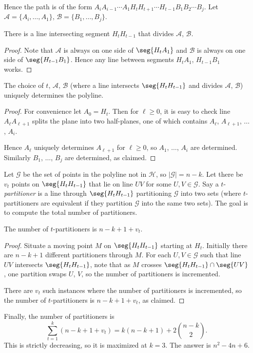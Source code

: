 Hence the path is of the form $A_iA_{i-1}\cdots A_1H_tH_{t+1}\cdots H_{t-1}B_1B_2\cdots B_j$. Let $\mathcal A=\{A_i,\ldots,A_1\}$, $\mathcal B=\{B_1,\ldots,B_j\}$.
\begin{claim}
    There is a line intersecting segment $H_tH_{t-1}$ that divides $\mathcal A$, $\mathcal B$.
\end{claim}
\begin{proof}
    Note that $\mathcal A$ is always on one side of $\seg{H_tA_1}$ and $\mathcal B$ is always on one side of $\seg{H_{t-1}B_1}$. Hence any line between segments $H_tA_1$, $H_{t-1}B_1$ works.
\end{proof}
\begin{claim}
    The choice of $t$, $\mathcal A$, $\mathcal B$ (where a line intersects $\seg{H_tH_{t-1}}$ and divides $\mathcal A$, $\mathcal B$) uniquely determines the polyline.
\end{claim}
\begin{proof}
    For convenience let $A_0=H_t$. Then for $\ell\ge0$, it is easy to check line $A_\ell A_{\ell+1}$ splits the plane into two half-planes, one of which contains $A_\ell$, $A_{\ell+1}$, $\ldots$, $A_i$.

    Hence $A_\ell$ uniquely determines $A_{\ell+1}$ for $\ell\ge0$, so $A_1$, $\ldots$, $A_i$ are determined. Similarly $B_1$, $\ldots$, $B_j$ are determined, as claimed.
\end{proof}

Let $\mathcal G$ be the set of points in the polyline not in $\mathcal H$, so $|\mathcal G|=n-k$. Let there be $v_t$ points on $\seg{H_tH_{t-1}}$ that lie on line $UV$ for some $U,V\in\mathcal G$. Say a $t$-\emph{partitioner} is a line through $\seg{H_tH_{t-1}}$ partitioning $\mathcal G$ into two sets (where $t$-partitioners are equivalent if they partition $\mathcal G$ into the same two sets). The goal is to compute the total number of partitioners.
\begin{claim}
    The number of $t$-partitioners is $n-k+1+v_t$.
\end{claim}
\begin{proof}
    Situate a moving point $M$ on $\seg{H_tH_{t-1}}$ starting at $H_t$. Initially there are $n-k+1$ different partitioners through $M$. For each $U,V\in\mathcal G$ such that line $UV$ intersects $\seg{H_tH_{t-1}}$, note that as $M$ crosses $\seg{H_tH_{t-1}}\cap\seg{UV}$, one partition swaps $U$, $V$, so the number of partitioners is incremented.

    There are $v_t$ such instances where the number of partitioners is incremented, so the number of $t$-partitioners is $n-k+1+v_t$, as claimed.
\end{proof}

Finally, the number of partitioners is \[\sum_{t=1}^k(n-k+1+v_t)=k(n-k+1)+2\binom{n-k}2.\]
This is strictly decreasing, so it is maximized at $k=3$. The answer is $n^2-4n+6$.

